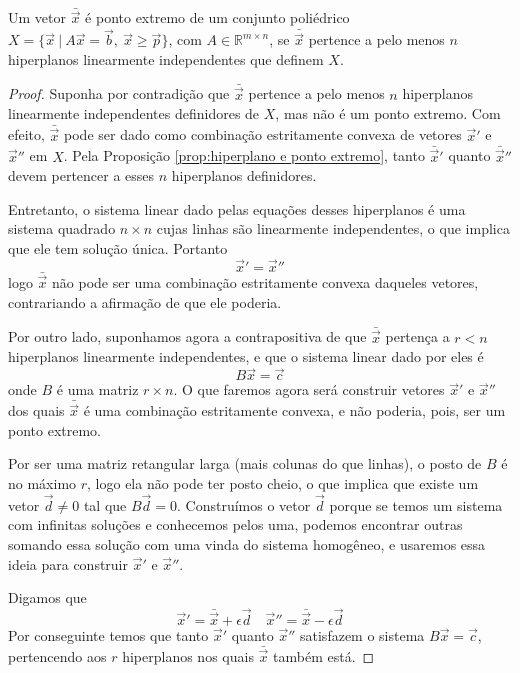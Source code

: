 \begin{thm:ponto extremo}
	\label{thm:ponto extremo}
	Um vetor $\bar{\vec{x}}$ é ponto extremo de um conjunto poliédrico $X = \{\vec{x}\ |\ A\vec{x} = \vec{b},\ \vec{x} \geq \vec{p}\}$, com $A \in \mathbb{R}^{m \times n}$, se $\bar{\vec{x}}$ pertence a pelo menos $n$ hiperplanos linearmente independentes que definem $X$.
	
	\begin{proof}
		Suponha por contradição que $\bar{\vec{x}}$ pertence a pelo menos $n$ hiperplanos linearmente independentes definidores de $X$, mas não é um ponto extremo. Com efeito, $\bar{\vec{x}}$ pode ser dado como combinação estritamente convexa de vetores $\vec{x}'$ e $\vec{x}''$ em $X$. Pela Proposição \ref{prop:hiperplano e ponto extremo}, tanto $\bar{\vec{x}}'$ quanto $\bar{\vec{x}}''$ devem pertencer a esses $n$ hiperplanos definidores.
		
		Entretanto, o sistema linear dado pelas equações desses hiperplanos é uma sistema quadrado $n \times n$ cujas linhas são linearmente independentes, o que implica que ele tem solução única. Portanto \[\vec{x}' = \vec{x}''\]logo $\bar{\vec{x}}$ não pode ser uma combinação estritamente convexa daqueles vetores, contrariando a afirmação de que ele poderia.
		
		Por outro lado, suponhamos agora a contrapositiva de que $\bar{\vec{x}}$ pertença a $r < n$ hiperplanos linearmente independentes, e que o sistema linear dado por eles é \[B\vec{x} = \vec{c}\]onde $B$ é uma matriz $r \times n$. O que faremos agora será construir vetores $\vec{x}'$ e $\vec{x}''$ dos quais $\bar{\vec{x}}$ é uma combinação estritamente convexa, e não poderia, pois, ser um ponto extremo.  
		
		Por ser uma matriz retangular larga (mais colunas do que linhas), o posto de $B$ é no máximo $r$, logo ela não pode ter posto cheio, o que implica que existe um vetor $\vec{d} \neq 0$ tal que $B \vec{d} = 0$. Construímos o vetor $\vec{d}$ porque se temos um sistema com infinitas soluções e conhecemos pelos uma, podemos encontrar outras somando essa solução com uma vinda do sistema homogêneo, e usaremos essa ideia para construir $\vec{x}'$ e $\vec{x}''$.
		
		Digamos que
		\begin{equation*}
			\vec{x}' = \bar{\vec{x}} + \epsilon \vec{d}
			\quad
			\vec{x}'' = \bar{\vec{x}} - \epsilon \vec{d}
		\end{equation*}
		Por conseguinte temos que tanto $\vec{x}'$ quanto $\vec{x}''$ satisfazem o sistema $B\vec{x} = \vec{c}$, pertencendo aos $r$ hiperplanos nos quais $\bar{\vec{x}}$ também está. 
		

\end{proof}
\end{thm:ponto extremo}
